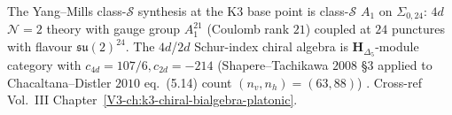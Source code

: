 \begin{remark}
\label{rem:yms-1}
The Yang--Mills class-$\mathcal S$ synthesis at the K3 base point is
class-$\mathcal S$ $A_1$ on $\Sigma_{0,24}$: $4d$ $\mathcal N=2$ theory
with gauge group $A_1^{21}$ (Coulomb rank $21$) coupled at $24$ punctures
with flavour $\mathfrak{su}(2)^{24}$. The $4d$/$2d$ Schur-index chiral
algebra is $\mathbf H_{\Delta_5}$-module category with
$c_{4d} = 107/6, c_{2d} = -214$ (Shapere--Tachikawa $2008$ \S 3
applied to Chacaltana--Distler $2010$ eq.~(5.14) count
$(n_v, n_h) = (63, 88)$)
\cite{Gaiotto2009,BeemRastelli2015,ChacaltanaDistler2010}.
Cross-ref Vol.~III Chapter~\ref{V3-ch:k3-chiral-bialgebra-platonic}.
\end{remark}
